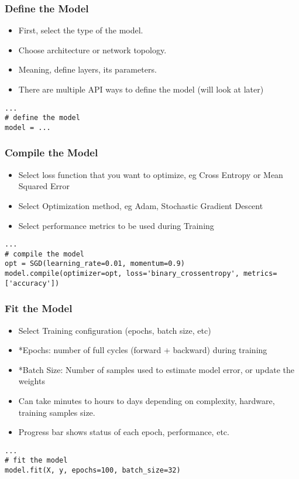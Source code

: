 \begin{frame}[fragile] \frametitle{Define the Model}

\begin{itemize}
\item  First, select the type of the model.
\item Choose architecture or network topology.
\item Meaning, define layers, its parameters.
\item There are multiple API ways to define the model (will look at later)
\end{itemize}

\begin{lstlisting}
...
# define the model
model = ...
\end{lstlisting}
\end{frame}

\begin{frame}[fragile] \frametitle{Compile the Model}

\begin{itemize}
\item Select loss function that you want to optimize, eg Cross Entropy or Mean Squared Error
\item Select Optimization method, eg Adam, Stochastic Gradient Descent
\item Select performance metrics to be used during Training
\end{itemize}

\begin{lstlisting}
...
# compile the model
opt = SGD(learning_rate=0.01, momentum=0.9)
model.compile(optimizer=opt, loss='binary_crossentropy', metrics=['accuracy'])
\end{lstlisting}
\end{frame}

\begin{frame}[fragile] \frametitle{Fit the Model}

\begin{itemize}
\item Select Training configuration (epochs, batch size, etc)
\item *Epochs: number of full cycles (forward + backward) during training
\item *Batch Size: Number of samples used to estimate model error, or update the weights
\item Can take minutes to hours to days depending on complexity, hardware, training samples size.
\item Progress bar shows status of each epoch, performance, etc.
\end{itemize}

\begin{lstlisting}
...
# fit the model
model.fit(X, y, epochs=100, batch_size=32)
\end{lstlisting}
\end{frame}

